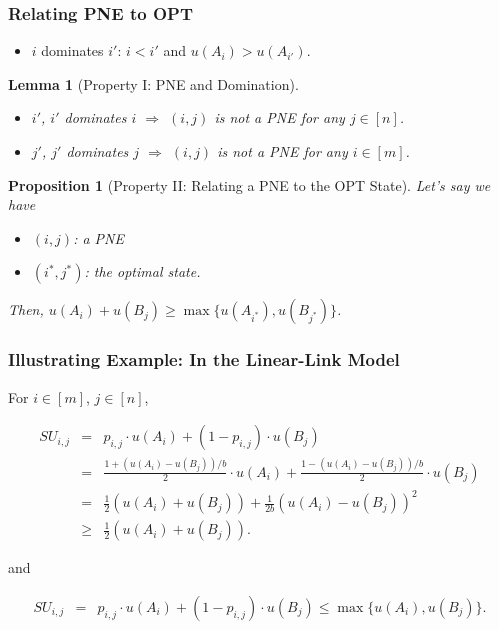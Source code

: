 \documentclass[xcolor=dvipsnames,envcountsect]{beamer}
\newtheorem*{prop}{Proposition}
\newtheorem*{lemm}{Lemma}
\begin{document}
\begin{frame}
\frametitle{Relating PNE to OPT}
\begin{itemize}
	\item $i$ dominates $i'$:  $i < i'$ and $u(A_i) > u(A_{i'})$.
\end{itemize}
\begin{lemm}[Property I: PNE and Domination]
	\begin{itemize}
		\item \exists $i'$, \; $i'$\; dominates \; $i$ \; $\Rightarrow$ $(i,j)$ is not a PNE for any $j\in [n]$.
		\item \exists $j'$, \; $j'$\; dominates \; $j$ \; $\Rightarrow$ $(i,j)$ is not a PNE for any $i\in [m]$.
	\end{itemize}
\end{lemm}	
	
\begin{prop}[Property II: Relating a PNE to the OPT State]
	Let's say we have  
	\begin{itemize}
		\item $(i,j)$: a PNE 
		\item $(i^*,j^*)$: the optimal state. 
	\end{itemize}
	Then, $u(A_i)+u(B_j)\geq \max\{u(A_{i^*}), u(B_{j^*})\}$.
\end{prop}
\end{frame}


\begin{frame}
\frametitle{Illustrating Example: In the Linear-Link Model}
For $i\in [m]$, $j\in [n]$,
\begin{small}
\begin{eqnarray*}
	SU_{i,j} &=& p_{i,j}\cdot u(A_i) + (1-p_{i,j})\cdot u(B_j)\\
	&=&\frac{1+(u(A_i)-u(B_j))/b}{2} \cdot u(A_i)
	+ \frac{1-(u(A_i)-u(B_j))/b}{2}\cdot u(B_j)\\
	&=& \frac{1}{2}(u(A_i)+u(B_j)) + \frac{1}{2b}(u(A_i)-u(B_j))^2\\
	&\geq& \frac{1}{2}(u(A_i)+u(B_j)).
\end{eqnarray*}
\end{small}
and 
\begin{small}
\begin{eqnarray*}
	SU_{i,j} &=& p_{i,j}\cdot u(A_i) + (1-p_{i,j})\cdot u(B_j)\leq \max\{u(A_i), u(B_j)\}.
\end{eqnarray*}
\end{small}

\end{frame}
\end{document}
